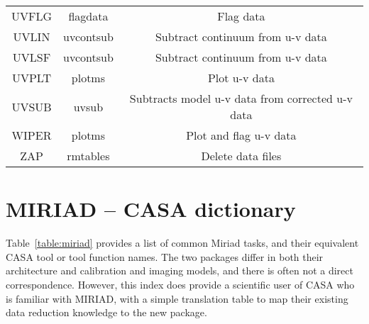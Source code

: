 \begin{table}[ht]
\begin{center}
\begin{tabular}{|c|c|c|}
UVFLG 	 & flagdata 	 & Flag data\\
UVLIN 	 & uvcontsub 	 & Subtract continuum from u-v data\\
UVLSF 	 & uvcontsub 	 & Subtract continuum from u-v data\\
UVPLT 	 & plotms  	 & Plot u-v data\\
UVSUB 	 & uvsub    	 & Subtracts model u-v data from corrected u-v data\\
WIPER 	 & plotms 	         & Plot and flag u-v data\\
ZAP 	 & rmtables 	 & Delete data files \\
\hline
\end{tabular}
\end{center}
\end{table}
\normalsize

\section{MIRIAD -- CASA dictionary}
\label{section:dict.miriad}

Table~\ref{table:miriad} provides a list of common Miriad tasks, and their
equivalent CASA tool or tool function names. The two packages differ
in both their architecture and calibration and imaging models, and
there is often not a direct correspondence. However, this index does
provide a scientific user of CASA who is familiar with MIRIAD, with
a simple translation table to map their existing data reduction
knowledge to the new package.


